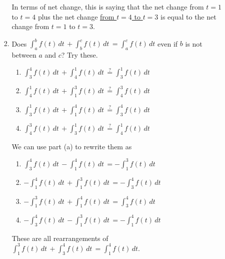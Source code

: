 \documentclass[main]{subfiles}
\begin{document}
\begin{enumerate}
\begin{enumerate}[topsep=0pt]
\begin{enumerate}[topsep=0pt]
\begin{solution}
            In terms of net change, this is saying that the net change from $t=1$
            to $t=4$ plus the net change \ul{from $t=4$ to $t=3$} is equal to the
            net change from $t=1$ to $t=3$.
    \end{solution}

    \item
    \begin{problem}
        Does $\displaystyle \int_a^b f(t)\,dt\, + \int_b^c f(t)\,dt\,
        = \int_a^c f(t)\,dt$ even if $b$ is not between $a$ and $c$? Try these.
    \end{problem}
   \begin{multicols}{2}
        \begin{enumerate}
            \item $\displaystyle \int_3^4 f(t)\,dt\, 
            + \int_4^1 f(t)\,dt\,
            \overset{?}{=} \int_3^1 f(t)\,dt$
            \item $\displaystyle \int_4^1 f(t)\,dt\, + \int_1^3 f(t)\,dt\,
            \overset{?}{=} \int_4^3 f(t)\,dt$
            \item $\displaystyle \int_3^1 f(t)\,dt\, + \int_1^4 f(t)\,dt\,
            \overset{?}{=} \int_3^4 f(t)\,dt$ 
            \item $\displaystyle \int_4^3 f(t)\,dt\, + \int_3^1 f(t)\,dt\,
            \overset{?}{=} \int_4^1 f(t)\,dt$
        \end{enumerate}
        \end{multicols}
        \bigskip
        \bigskip
        \begin{solution} 
         We can use part (a) to rewrite them as 
        \begin{enumerate}
            \item $\displaystyle \int_3^4 f(t)\,dt\, 
            - \int_1^4 f(t)\,dt\,
            = - \int_1^3 f(t)\,dt$
            \item $\displaystyle - \int_1^4 f(t)\,dt\, + \int_1^3 f(t)\,dt\,
            = - \int_3^4 f(t)\,dt$
            \item $\displaystyle -\int_1^3 f(t)\,dt\, + \int_1^4 f(t)\,dt\,
            = \int_3^4 f(t)\,dt$ 
            \item $\displaystyle -\int_3^4 f(t)\,dt\, - \int_1^3 f(t)\,dt\,
            = - \int_1^4 f(t)\,dt$
        \end{enumerate}
        These are all rearrangements of
        $\displaystyle \int_1^3 f(t)\,dt\,
      + \int_3^4 f(t)\,dt\, = \int_1^4 f(t)\,dt$.
        \end{solution}
    \end{enumerate}


\end{enumerate}
\end{enumerate}
\end{document}
